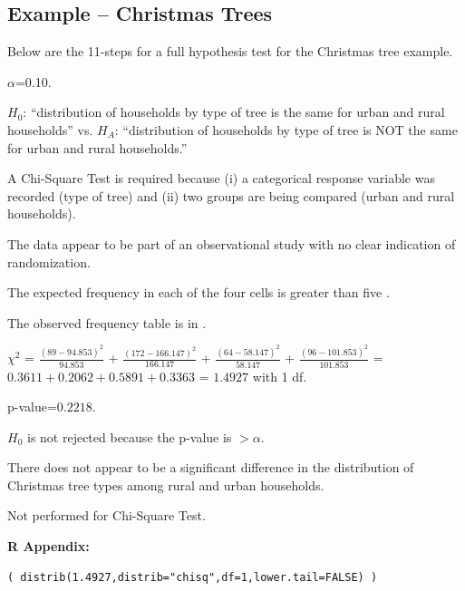 \documentclass[10pt,openany]{book}\usepackage[]{graphicx}\usepackage[]{color}
\makeatletter
\newenvironment{kframe}{%
 \def\at@end@of@kframe{}%
 \ifinner\ifhmode%
  \def\at@end@of@kframe{\end{minipage}}%
  \begin{minipage}{\columnwidth}%
 \fi\fi%
 \def\FrameCommand##1{\hskip\@totalleftmargin \hskip-\fboxsep
 \colorbox{shadecolor}{##1}\hskip-\fboxsep
     \hskip-\linewidth \hskip-\@totalleftmargin \hskip\columnwidth}%
 \MakeFramed {\advance\hsize-\width
   \@totalleftmargin\z@ \linewidth\hsize
   \@setminipage}}%
 {\par\unskip\endMakeFramed%
 \at@end@of@kframe}
\newenvironment{knitrout}{}{} %
\makeatother
\begin{document}
\subsection{Example -- Christmas Trees}
\vspace{-6pt}
Below are the 11-steps  for a full hypothesis test for the Christmas tree example.
\vspace{-10pt}
\begin{Enumerate}
  \item $\alpha$=0.10.
  \item $H_{0}$: ``distribution of households by type of tree is the same for urban and rural households'' vs. $H_{A}$: ``distribution of households by type of tree is NOT the same for urban and rural households.''
  \item A Chi-Square Test is required because (i) a categorical response variable was recorded (type of tree) and (ii) two groups are being compared (urban and rural households).
  \item The data appear to be part of an observational study with no clear indication of randomization.
  \item The expected frequency in each of the four cells is greater than five .
  \item The observed frequency table is in .
  \item $\chi^{2}$ = $\frac{(89-94.853)^{2}}{94.853}$ + $\frac{(172-166.147)^{2}}{166.147}$ + $\frac{(64-58.147)^{2}}{58.147}$ + $\frac{(96-101.853)^{2}}{101.853}$ = $0.3611+0.2062+0.5891+0.3363$ = $1.4927$ with 1 df.
  \item p-value=$0.2218$.
  \item $H_{0}$ is not rejected because the p-value is $>\alpha$.
  \item There does not appear to be a significant difference in the distribution of Christmas tree types among rural and urban households.
  \item Not performed for Chi-Square Test.
\end{Enumerate}

\vspace{-6pt}
\begin{minipage}{\textwidth}
\textbf{R Appendix:}
\vspace{-6pt}
\begin{knitrout}
\color{fgcolor}\begin{kframe}
\begin{verbatim}
( distrib(1.4927,distrib="chisq",df=1,lower.tail=FALSE) )
\end{verbatim}
\end{kframe}
\end{knitrout}
\end{minipage}





%    
\end{document}
